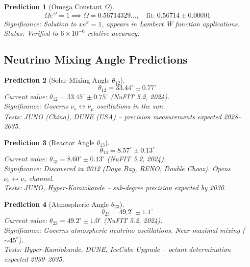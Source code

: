 \documentclass[aps,prd,preprint,superscriptaddress,showpacs,nofootinbib,longbibliography]{revtex4-2}
\newtheorem{prediction}{Prediction}
\begin{document}
\begin{prediction}[Omega Constant $\Omega$]
\label{pred:omega}
\begin{equation}
\Omega e^\Omega = 1 \implies \Omega = 0.56714329\ldots, \quad \text{fit: } 0.56714 \pm 0.00001
\end{equation}
\textit{Significance:} Solution to $x e^x = 1$, appears in Lambert W function applications.\\
\textit{Status:} Verified to $6\times10^{-6}$ relative accuracy.
\end{prediction}

\subsection{Neutrino Mixing Angle Predictions}

\begin{prediction}[Solar Mixing Angle $\theta_{12}$]
\label{pred:theta12}
\begin{equation}
\theta_{12} = 33.44^\circ \pm 0.77^\circ
\end{equation}
\textit{Current value:} $\theta_{12} = 33.45^\circ \pm 0.75^\circ$ (NuFIT 5.2, 2024).\\
\textit{Significance:} Governs $\nu_e \leftrightarrow \nu_\mu$ oscillations in the sun.\\
\textit{Tests:} JUNO (China), DUNE (USA) -- precision measurements expected 2028--2035.
\end{prediction}

\begin{prediction}[Reactor Angle $\theta_{13}$]
\label{pred:theta13}
\begin{equation}
\theta_{13} = 8.57^\circ \pm 0.13^\circ
\end{equation}
\textit{Current value:} $\theta_{13} = 8.60^\circ \pm 0.13^\circ$ (NuFIT 5.2, 2024).\\
\textit{Significance:} Discovered in 2012 (Daya Bay, RENO, Double Chooz). Opens $\nu_e \leftrightarrow \nu_\tau$ channel.\\
\textit{Tests:} JUNO, Hyper-Kamiokande -- sub-degree precision expected by 2030.
\end{prediction}

\begin{prediction}[Atmospheric Angle $\theta_{23}$]
\label{pred:theta23}
\begin{equation}
\theta_{23} = 49.2^\circ \pm 1.1^\circ
\end{equation}
\textit{Current value:} $\theta_{23} = 49.2^\circ \pm 1.0^\circ$ (NuFIT 5.2, 2024).\\
\textit{Significance:} Governs atmospheric neutrino oscillations. Near maximal mixing ($\sim45^\circ$).\\
\textit{Tests:} Hyper-Kamiokande, DUNE, IceCube Upgrade -- octant determination expected 2030--2035.
\end{prediction}
\end{document}
